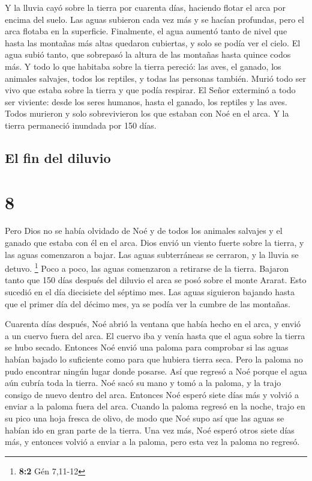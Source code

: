  Y la lluvia cayó sobre la tierra por cuarenta días,
haciendo flotar el arca por encima del suelo.  Las aguas
subieron cada vez más y se hacían profundas, pero el arca flotaba en la
superficie.  Finalmente, el agua aumentó tanto de nivel
que hasta las montañas más altas quedaron cubiertas, y solo se podía ver
el cielo.  El agua subió tanto, que sobrepasó la altura
de las montañas hasta quince codos más.  Y todo lo que
habitaba sobre la tierra pereció: las aves, el ganado, los animales
salvajes, todos los reptiles, y todas las personas también.
 Murió todo ser vivo que estaba sobre la tierra y que
podía respirar.  El Señor exterminó a todo ser viviente:
desde los seres humanos, hasta el ganado, los reptiles y las aves. Todos
murieron y solo sobrevivieron los que estaban con Noé en el arca.
 Y la tierra permaneció inundada por 150 días.

\hypertarget{el-fin-del-diluvio}{%
\subsection{El fin del diluvio}\label{el-fin-del-diluvio}}

\hypertarget{section-7}{%
\section{8}\label{section-7}}

 Pero Dios no se había olvidado de Noé y de todos los
animales salvajes y el ganado que estaba con él en el arca. Dios envió
un viento fuerte sobre la tierra, y las aguas comenzaron a bajar.
 Las aguas subterráneas se cerraron, y la lluvia se
detuvo. \footnote{\textbf{8:2} Gén 7,11-12}  Poco a poco,
las aguas comenzaron a retirarse de la tierra. Bajaron tanto que 150
días después del diluvio  el arca se posó sobre el monte
Ararat. Esto sucedió en el día diecisiete del séptimo mes.
 Las aguas siguieron bajando hasta que el primer día del
décimo mes, ya se podía ver la cumbre de las montañas.

 Cuarenta días después, Noé abrió la ventana que había
hecho en el arca,  y envió a un cuervo fuera del arca. El
cuervo iba y venía hasta que el agua sobre la tierra se hubo secado.
 Entonces Noé envió una paloma para comprobar si las aguas
habían bajado lo suficiente como para que hubiera tierra seca.
 Pero la paloma no pudo encontrar ningún lugar donde
posarse. Así que regresó a Noé porque el agua aún cubría toda la tierra.
Noé sacó su mano y tomó a la paloma, y la trajo consigo de nuevo dentro
del arca.  Entonces Noé esperó siete días más y volvió a
enviar a la paloma fuera del arca.  Cuando la paloma
regresó en la noche, trajo en su pico una hoja fresca de olivo, de modo
que Noé supo así que las aguas se habían ido en gran parte de la tierra.
 Una vez más, Noé esperó otros siete días más, y entonces
volvió a enviar a la paloma, pero esta vez la paloma no regresó.


